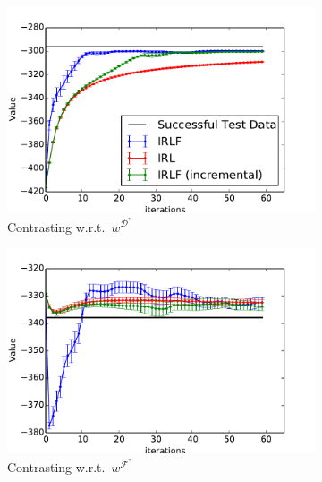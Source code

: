 \documentclass[letterpaper]{article}
\begin{document}
\begin{figure}[t]
  \centering
  \begin{subfigure}[b]{0.52\columnwidth}
    \includegraphics[trim=0.5cm 0.5cm 0.5cm 0,clip=true,width=\textwidth]{images/expert_apprentice_contrastive.pdf}

    
    \caption{Contrasting w.r.t.\ $w^{\mathcal{D}^*}$}
    \label{fig:toy_expert_apprentice_contrastive}
  \end{subfigure}
  \hfill
  \begin{subfigure}[b]{0.52\columnwidth}
    \includegraphics[trim=0.5cm 0.5cm 0.5cm 0,clip=true,width=\textwidth]{images/taboo_apprentice_contrastive.pdf}

    
    \caption{Contrasting w.r.t.\ $w^{\mathcal{F}^*}$}
    \label{fig:toy_taboo_apprentice_contrastive}
  \end{subfigure}  
  \label{fig:contrastive}
  \begin{subfigure}[b]{0.52\columnwidth}


\end{subfigure}
\end{figure}
\end{document}
